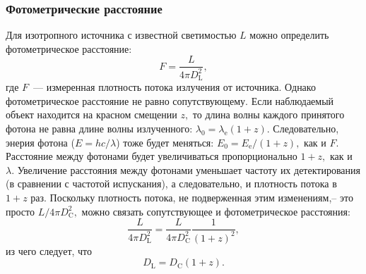 \subsubsection{Фотометрические расстояние}
Для изотропного источника с известной светимостью $L$ можно определить фотометрическое расстояние:
$$
F = \frac{L}{4 \pi D_{\text{L}}^2},
$$
где $F$~--- измеренная плотность потока излучения от источника. Однако фотометрическое расстояние не равно сопутствующему.
Если наблюдаемый объект находится на красном смещении $z,$ то длина волны каждого принятого фотона не равна длине волны излученного: $\lambda_0 = \lambda_{\text{e}} (1 + z).$ Следовательно, 
энерия фотона ($E = hc \slash \lambda$) тоже будет меняться: $E_0 = E_{\text{e}} \slash (1 + z),$ как и $F.$ Расстояние между фотонами будет увеличиваться пропорционально $1 + z,$ как и $\lambda.$ Увеличение расстояния 
между фотонами уменьшает частоту их детектирования (в сравнении с частотой испускания), а следовательно, и плотность потока в $1 + z$ раз. Поскольку плотность потока, не подверженная этим изменениям,-- это 
просто $L \slash 4 \pi D_{\text{C}}^2,$ можно связать сопутствующее и фотометрическое расстояния:
$$
\frac{L}{4 \pi D_{\text{L}}^2} = \frac{L}{4 \pi D_{\text{C}}^2} \frac{1}{(1 + z)^2},
$$
из чего следует, что
\begin{equation}
    D_{\text{L}} = D_{\text{C}} (1 + z).
\end{equation}
